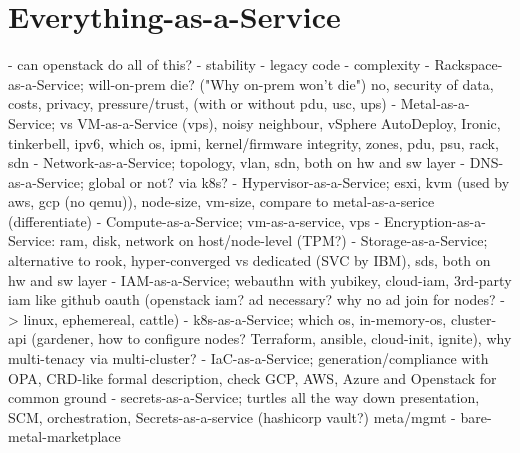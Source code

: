 
\section{Everything-as-a-Service}
- can openstack do all of this?
  - stability
  - legacy code
  - complexity
- Rackspace-as-a-Service; will-on-prem die? ("Why on-prem won't die") no, security of data, costs, privacy, pressure/trust, (with or without pdu, usc, ups)
- Metal-as-a-Service; vs VM-as-a-Service (vps), noisy neighbour, vSphere AutoDeploy, Ironic, tinkerbell, ipv6, which os, ipmi, kernel/firmware integrity, zones, pdu, psu, rack, sdn
- Network-as-a-Service; topology, vlan, sdn, both on hw and sw layer
- DNS-as-a-Service; global or not? via k8s?
- Hypervisor-as-a-Service; esxi, kvm (used by aws, gcp (no qemu)), node-size, vm-size, compare to metal-as-a-serice (differentiate)
- Compute-as-a-Service; vm-as-a-service, vps
- Encryption-as-a-Service: ram, disk, network on host/node-level (TPM?)
- Storage-as-a-Service; alternative to rook, hyper-converged vs dedicated (SVC by IBM), sds, both on hw and sw layer
- IAM-as-a-Service; webauthn with yubikey, cloud-iam, 3rd-party iam like github oauth (openstack iam? ad necessary? why no ad join for nodes? -> linux, ephemereal, cattle)
- k8s-as-a-Service; which os, in-memory-os, cluster-api (gardener, how to configure nodes? Terraform, ansible, cloud-init, ignite), why multi-tenacy via multi-cluster?
- IaC-as-a-Service; generation/compliance with OPA, CRD-like formal description, check GCP, AWS, Azure and Openstack for common ground
- secrets-as-a-Service; turtles all the way down presentation, SCM, orchestration, Secrets-as-a-service (hashicorp vault?)
meta/mgmt
- bare-metal-marketplace

